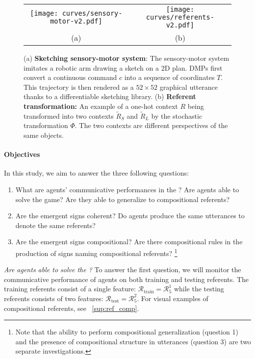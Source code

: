 \begin{figure}[h!]
\centering 
\vspace{-0.3cm}
\begin{tabular}{cc}
\texttt{[image: curves/sensory-motor-v2.pdf]} &  \texttt{[image: curves/referents-v2.pdf]}\\
(a) & (b)
\end{tabular}
\vspace{-0.2cm}
\caption{(a) \textbf{Sketching sensory-motor system}: The sensory-motor system imitates a robotic arm drawing a sketch on a 2D plan. DMPs first convert a continuous command $c$ into a sequence of coordinates $T$. This trajectory is then rendered as a $52\times52$ graphical utterance thanks to a differentiable sketching library. (b) \textbf{Referent transformation:} An example of a one-hot context $R$ being transformed into two contexts $\tilde{R}_S$ and $\tilde{R}_L$ by the stochastic transformation $\Phi$. The two contexts are different perspectives of the same objects.}
\vspace{-0.1cm}
\label{fig:prob_def}
\end{figure}

\paragraph{Objectives} 

In this study, we aim to answer the three following questions:
\begin{enumerate}[noitemsep,topsep=0pt]
\item What are agents' communicative performances in the \greg? Are agents able to solve the game? Are they able to generalize to compositional referents?
\item Are the emergent signs coherent? Do agents produce the same utterances to denote the same referents?
\item Are the emergent signs compositional? Are there compositional rules in the production of signs naming compositional referents? \footnote{Note that the ability to perform compositional generalization (question 1) and the presence of compositional structure in utterances (question 3) are two separate investigations.}
\end{enumerate}

\textit{Are agents able to solve the \greg? } To answer the first question,  we will monitor the communicative
performance of agents on both training and testing referents.  The training referents consist of a single feature: $\mathcal{R}_{\text{train}} = \mathcal{R}_5^1$ while the testing referents consists of two features: $\mathcal{R}_{\text{test}}=\mathcal{R}_5^2$. For visual examples of compositional referents, see~ \ap\ref{sup:ref_comp}.

